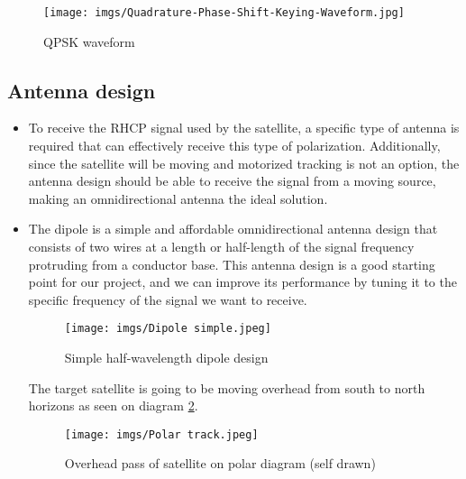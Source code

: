 \documentclass{article}
\begin{document}
\begin{itemize}
            \begin{figure}[H]
                \centering
                \texttt{[image: imgs/Quadrature-Phase-Shift-Keying-Waveform.jpg]}
                \caption{QPSK waveform \cite{8}}
                \label{mod-type-img}
            \end{figure}
            
            
        \end{itemize}
  \subsection{Antenna design}
        \begin{itemize}
            \item[] To receive the RHCP signal used by the satellite, a specific type of antenna is required that can effectively receive this type of polarization. Additionally, since the satellite will be moving and motorized tracking is not an option, the antenna design should be able to receive the signal from a moving source, making an omnidirectional antenna the ideal solution.


            \item[] The dipole is a simple and affordable omnidirectional antenna design that consists of two wires at a length or half-length of the signal frequency protruding from a conductor base. This antenna design is a good starting point for our project, and we can improve its performance by tuning it to the specific frequency of the signal we want to receive.

        \begin{figure}[H]
            \centering
            \texttt{[image: imgs/Dipole simple.jpeg]}
            \caption{Simple half-wavelength dipole design\cite{10}}
        \end{figure}

        The target satellite is going to be moving overhead from south to north horizons as seen on diagram \ref{polar-axis}.

        \begin{figure}[H]
            \centering
            \texttt{[image: imgs/Polar track.jpeg]}
            \caption{Overhead pass of satellite on polar diagram (self drawn)}
            \label{polar-axis}
        \end{figure}


\end{itemize}
\end{document}
